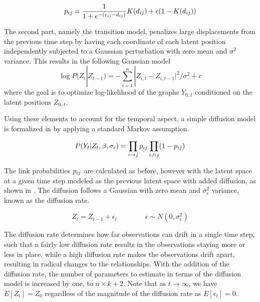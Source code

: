         \begin{equation}\label{eq:dsnl-link-proba}
            \sub(p)=\frac{1}{1 + e^{-(\sub(r)-\sub(d))}} K(\sub(d)) + \epsilon(1-K(\sub(d)))
        \end{equation}
        
        The second part, namely the transition model, penalizes large displacements from the previous time step by having each coordinate of each latent position independently subjected to a Gaussian perturbation with zero mean and $\sigma^2$ variance. This results in the following Gaussian model
        \begin{equation}\label{eq:dsnl-transition}
            \log P(Z_t|Z_{t-1}) = -\sum_{i=1}^n |Z_{i,t}-Z_{i,t-1}|^2 / \sigma^2 + c
        \end{equation}
        where the goal is to optimize log-likelihood of the graphs $Y_{0..t}$ conditioned on the latent positions $Z_{0..t}$.
        
        Using these elements to account for the temporal aspect, a simple diffusion model is formalized in  by applying a standard Markov assumption. 
        
        \begin{equation}\label{eq:dsnl-model}
            P(Y_t|Z_t,\beta,\sigma_\epsilon) = \prod_{\link}\sub(p)\prod_{\link*}(1-\sub(p))
        \end{equation}
        
        The link probabilities $\sub(p)$ are calculated as before, however with the latent space at a given time step modeled as the previous latent space with added diffusion, as shown in . The diffusion follows a Gaussian with zero mean and $\sigma_\epsilon^2$ variance, known as the diffusion rate.
        
        \begin{equation}\label{eq:dsnl-latent-space}
            Z_t = Z_{t-1} + \epsilon_t \qquad\qquad \epsilon \sim N(0,\sigma_\epsilon^2)
        \end{equation}
        
        The diffusion rate determines how far observations can drift in a single time step, such that a fairly low diffusion rate results in the observations staying more or less in place, while a high diffusion rate makes the observations drift apart, resulting in radical changes to the relationships. With the addition of the diffusion rate, the number of parameters to estimate in terms of the diffusion model is increased by one, to $n \times k + 2$. Note that as $t\rightarrow\infty$, we have $E[Z_t]=Z_0$ regardless of the magnitude of the diffusion rate as $E[\epsilon_t]=0$.
        

